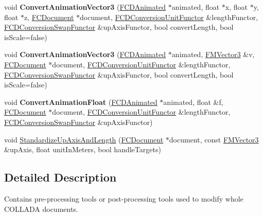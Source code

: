 \begin{DoxyCompactItemize}
\item 
\hypertarget{namespaceFCDocumentTools_a3aef565d28aa7bf2d3ba700cd3e6ff9d}{
void {\bfseries ConvertAnimationVector3} (\hyperlink{classFCDAnimated}{FCDAnimated} $\ast$animated, float $\ast$x, float $\ast$y, float $\ast$z, \hyperlink{classFCDocument}{FCDocument} $\ast$document, \hyperlink{classFCDocumentTools_1_1FCDConversionUnitFunctor}{FCDConversionUnitFunctor} \&lengthFunctor, \hyperlink{classFCDocumentTools_1_1FCDConversionSwapFunctor}{FCDConversionSwapFunctor} \&upAxisFunctor, bool convertLength, bool isScale=false)}
\label{namespaceFCDocumentTools_a3aef565d28aa7bf2d3ba700cd3e6ff9d}

\item 
\hypertarget{namespaceFCDocumentTools_a10d4eeaab6d554c304fc7cec3ee934b3}{
void {\bfseries ConvertAnimationVector3} (\hyperlink{classFCDAnimated}{FCDAnimated} $\ast$animated, \hyperlink{classFMVector3}{FMVector3} \&v, \hyperlink{classFCDocument}{FCDocument} $\ast$document, \hyperlink{classFCDocumentTools_1_1FCDConversionUnitFunctor}{FCDConversionUnitFunctor} \&lengthFunctor, \hyperlink{classFCDocumentTools_1_1FCDConversionSwapFunctor}{FCDConversionSwapFunctor} \&upAxisFunctor, bool convertLength, bool isScale=false)}
\label{namespaceFCDocumentTools_a10d4eeaab6d554c304fc7cec3ee934b3}

\item 
\hypertarget{namespaceFCDocumentTools_ad45522454e59e87d8e5d35d914c5ff32}{
void {\bfseries ConvertAnimationFloat} (\hyperlink{classFCDAnimated}{FCDAnimated} $\ast$animated, float \&f, \hyperlink{classFCDocument}{FCDocument} $\ast$document, \hyperlink{classFCDocumentTools_1_1FCDConversionUnitFunctor}{FCDConversionUnitFunctor} \&lengthFunctor, \hyperlink{classFCDocumentTools_1_1FCDConversionSwapFunctor}{FCDConversionSwapFunctor} \&upAxisFunctor)}
\label{namespaceFCDocumentTools_ad45522454e59e87d8e5d35d914c5ff32}

\item 
void \hyperlink{namespaceFCDocumentTools_a2c30506a0db61b68aa07f18b025e935e}{StandardizeUpAxisAndLength} (\hyperlink{classFCDocument}{FCDocument} $\ast$document, const \hyperlink{classFMVector3}{FMVector3} \&upAxis, float unitInMeters, bool handleTargets)
\end{DoxyCompactItemize}


\subsection{Detailed Description}
Contains pre-\/processing tools or post-\/processing tools used to modify whole COLLADA documents. 

